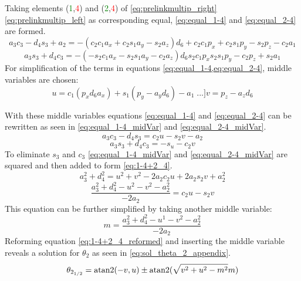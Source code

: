 Taking elements (\textcolor{green}{1},\textcolor{red}{4}) and (\textcolor{green}{2},\textcolor{red}{4}) of \ref{eq:prelinkmultip_right} \ref{eq:prelinkmultip_left} as corresponding equal,  \ref{eq:equal_1-4} and \ref{eq:equal_2-4} are formed.
\begin{equation}\label{eq:equal_1-4}
a_3 c_3 - d_4 s_3 + a_2 = - (c_2 c_1 a_x + c_2 s_1 a_y -s_2 a_z)d_6 + c_2 c_1 p_x + c_2 s_1 p_y -s_2 p_z -c_2 a_1
\end{equation}
\begin{equation}\label{eq:equal_2-4}
a_3 s_3 +d_4 c_3 = - (- s_2 c_1 a_x - s_2 s_1 a_y - c_2 a_z)d_6 s_2 c_1 p_x s_2 s_1 p_y  -c_2 p_z +s_2 a_1
\end{equation}
For simplification of the terms in equations \cref{eq:equal_1-4,eq:equal_2-4}, middle variables are chosen:
\begin{equation}
u=c_1 (p_x d_6 a_x ) + s_1 (p_y -a_y d_6)-a_1 \phantom[...]
v= p_z - a_z d_6
\end{equation}

With these middle variables equations \ref{eq:equal_1-4} and \ref{eq:equal_2-4} can be rewritten as seen in \ref{eq:equal_1-4_midVar} and \ref{eq:equal_2-4_midVar}.
\begin{equation}\label{eq:equal_1-4_midVar}
a_3 c_3 - d_4 s_3 = c_2 u -s_2 v -a_2 
\end{equation}
\begin{equation}\label{eq:equal_2-4_midVar}
a_3 s_3 + d_4 c_3 = - s_ u - c_2 v
\end{equation}
To eliminate $s_3$ and $c_3$ \ref{eq:equal_1-4_midVar} and \ref{eq:equal_2-4_midVar} are squared and then added to form \ref{eq:1-4+2_4}.
\begin{equation}\label{eq:1-4+2_4}
a_3^2 +d_4^2 = u^2 +v^2 - 2a_2 c_2 u + 2a_2 s_2 v +a_2^2
\end{equation}
\begin{equation}\label{eq:1-4+2_4_reformed}
\frac{a_3^2 + d_4^2 - u^2 - v^2 -a_2^2}{-2a_2}= c_2 u -s_2 v
\end{equation}
This equation can be further simplified by taking another middle variable:
\begin{equation*}
m = \frac{a_3^2 +d_4^2 - u^1 -v^2 - a_2^2}{-2a_2}
\end{equation*}
Reforming equation \ref{eq:1-4+2_4_reformed} and inserting the middle variable reveals a solution for $\theta_2$ as seen in \ref{eq:sol_theta_2_appendix}.
\begin{equation}\label{eq:sol_theta_2_appendix}
\theta_{2_{1/2}} = \operatorname{atan2} (-v , u)\pm \operatorname{atan2}(\sqrt{v^2 +u^2 - m^2 }  m)
\end{equation}



